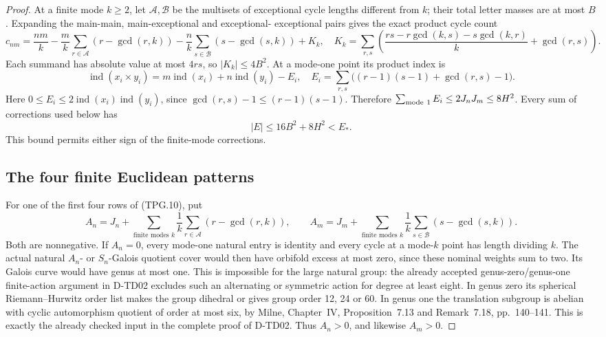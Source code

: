 \begin{proof}
At a finite mode \(k\ge2\), let \(\mathcal A,\mathcal B\)
be the multisets of exceptional cycle lengths different from
\(k\); their total letter masses are at most \(B\).
Expanding the main-main, main-exceptional and exceptional-
exceptional pairs gives the exact product cycle count
\[
 c_{nm}=
 \frac{nm}{k}
 -\frac{m}{k}\sum_{r\in\mathcal A}(r-\gcd(r,k))
 -\frac{n}{k}\sum_{s\in\mathcal B}(s-\gcd(s,k))
 +K_k,
 \quad
 K_k=\sum_{r,s}\left(
 \frac{rs-r\gcd(k,s)-s\gcd(k,r)}{k}+\gcd(r,s)\right).
 \tag{TPG.12}
\]
Each summand has absolute value at most \(4rs\), so
\(|K_k|\le4B^2\).  At a mode-one point its product index is
\[
 \operatorname{ind}(x_i\times y_i)
 =m\operatorname{ind}(x_i)+n\operatorname{ind}(y_i)-E_i,
 \quad
 E_i=\sum_{r,s}\bigl((r-1)(s-1)+\gcd(r,s)-1\bigr).
 \tag{TPG.13}
\]
Here \(0\le E_i\le2\operatorname{ind}(x_i)
\operatorname{ind}(y_i)\), since
\(\gcd(r,s)-1\le(r-1)(s-1)\).  Therefore
\(\sum_{\rm mode\ 1}E_i\le2J_nJ_m\le8H^2\).
Every sum of corrections used below has
\[
 |E|\le16B^2+8H^2<E_*.
 \tag{TPG.14}
\]
This bound permits either sign of the finite-mode corrections.

\subsection*{The four finite Euclidean patterns}

For one of the first four rows of (TPG.10), put
\[
 A_n=J_n+\sum_{\text{finite modes }k}
           \frac1k\sum_{r\in\mathcal A}(r-\gcd(r,k)),
 \qquad
 A_m=J_m+\sum_{\text{finite modes }k}
           \frac1k\sum_{s\in\mathcal B}(s-\gcd(s,k)).
 \tag{TPG.15}
\]
Both are nonnegative.  If \(A_n=0\), every mode-one
natural entry is identity and every cycle at a mode-\(k\)
point has length dividing \(k\).  The actual natural
\(A_n\)- or \(S_n\)-Galois quotient cover would then have
orbifold excess at most zero, since these nominal weights
sum to two.  Its Galois curve would have genus at most one.
This is impossible for the large natural group: the already
accepted genus-zero/genus-one finite-action argument in D-TD02
excludes such an alternating or symmetric action for degree at
least eight.  In genus zero its spherical Riemann--Hurwitz
order list makes the group dihedral or gives group order
12, 24 or 60.  In genus one the translation subgroup is
abelian with cyclic automorphism quotient of order at most six,
by Milne, Chapter~IV, Proposition~7.13 and Remark~7.18,
pp.~140--141.\cite{TD:MilneEC2021}  This is exactly the
already checked input in the complete proof of D-TD02.
Thus \(A_n>0\), and likewise \(A_m>0\).


\end{proof}
